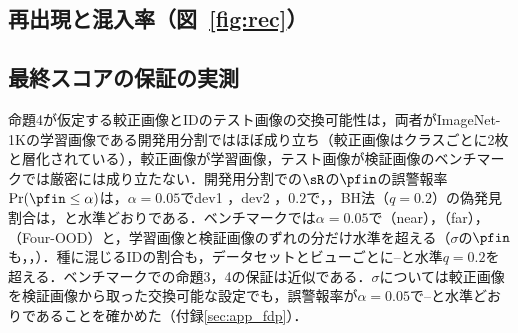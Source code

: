 \begin{table}[t]
\caption{同じ特徴での読み出しの比較（[\%]，$\times$TINS；単体は付録\ref{sec:app_sens}の）．静的$p$とkNNはグラフを使わない検出器，LGC-maxは同じグラフ上のクラスラベル伝播（いずれも較正順位で読む）．$\pP$は支持画像からの伝播，$\pN$は種からの伝播．到着時採点は付録\ref{sec:app_online}のモード（抽出は1通り）．\textcolor{sotacol}{$\bigstar$}は列の最良値．}
\label{tab:abl}
\centering
\vspace{0.5mm}

\end{table}

\begin{table}[t]
\caption{$u^{+}=\sqrt{\delta}\,q$の二つの因子（単体，AUROC／FPR95 [\%]，6通りの抽出の平均）．上の3行はビューごとの値のラベル付き画像4,000枚（参照画像と較正画像）の中での順位の対数和（$\sqrt{\delta}$と$q$はそれぞれ単独，$u^{+}$は積），4行目は交差適合した$\sigma$の読み出しの順位を$u^{\pm}/\sqrt{\delta}$で取ったもの（種は同じ）．}
\label{tab:dec}
\centering
\vspace{0.5mm}

\end{table}

\subsection{再出現と混入率（図~\ref{fig:rec}）}
\label{sec:rec}


\subsection{最終スコアの保証の実測}
\label{sec:fdp}
命題4が仮定する較正画像とIDのテスト画像の交換可能性は，両者がImageNet-1Kの学習画像である開発用分割ではほぼ成り立ち（較正画像はクラスごとに2枚と層化されている），較正画像が学習画像，テスト画像が検証画像のベンチマークでは厳密には成り立たない．開発用分割での$\sR$の$\pfin$の誤警報率$\Pr(\pfin\le\alpha)$は，$\alpha{=}0.05$でdev1 \NRDevOneFprFive{}，dev2 \NRDevTwoFprFive{}，$0.2$で\NRDevOneFprTwenty{}，\NRDevTwoFprTwenty{}，BH法（$q{=}0.2$）の偽発見割合は\NRDevOneBhFdp{}，\NRDevTwoBhFdp{}と水準どおりである．ベンチマークでは$\alpha{=}0.05$で\NRValNearFprFive{}（near），\NRValFarFprFive{}（far），\NRValFourFprFive{}（Four-OOD）と，学習画像と検証画像のずれの分だけ水準を超える（$\sigma$の$\pfin$も\NRValSigNearFprFive{}，\NRValSigFarFprFive{}，\NRValSigFourFprFive）．種に混じるIDの割合も，データセットとビューごとに\NRSeedBenchIdMin--\NRSeedBenchIdMax{}と水準$q{=}0.2$を超える．ベンチマークでの命題3，4の保証は近似である．$\sigma$については較正画像を検証画像から取った交換可能な設定でも，誤警報率が$\alpha{=}0.05$で\NVcalFprZeroZeroFiveMin{}--\NVcalFprZeroZeroFiveMax{}と水準どおりであることを確かめた（付録\ref{sec:app_fdp}）．

